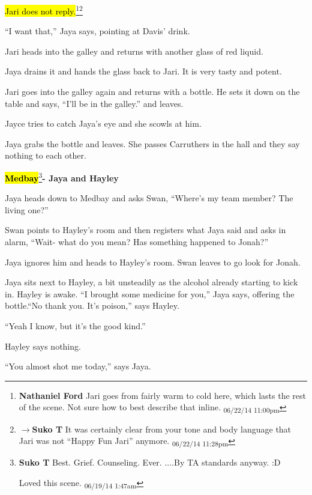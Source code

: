 \hl{Jari does not reply.}\footnote{\textbf{Nathaniel Ford }Jari goes from fairly warm to cold here, which lasts the rest of the scene. Not sure how to best describe that inline. \textsubscript{06/22/14 11:00pm}}\footnote{$\rightarrow$\textbf{Suko T }It was certainly clear from your tone and body language that Jari was not ``Happy Fun Jari'' anymore. \textsubscript{06/22/14 11:28pm}}

``I want that,'' Jaya says, pointing at Davis' drink.

Jari heads into the galley and returns with another glass of red liquid.

Jaya drains it and hands the glass back to Jari.  It is very tasty and potent.

Jari goes into the galley again and returns with a bottle.  He sets it down on the table and says, ``I'll be in the galley.'' and leaves.



Jayce tries to catch Jaya's eye and she scowls at him.



Jaya grabs the bottle and leaves.  She passes Carruthers in the hall and they say nothing to each other.





\textbf{\hl{Medbay}}\footnote{\textbf{Suko T }Best.  Grief.  Counseling.  Ever.  
....By TA standards anyway. :D

Loved this scene. \textsubscript{06/19/14 1:47am}}\textbf{- Jaya and Hayley}



Jaya heads down to Medbay and asks Swan, ``Where's my team member?  The living one?''

Swan points to Hayley's room and then registers what Jaya said and asks in alarm, ``Wait- what do you mean?  Has something happened to Jonah?''



Jaya ignores him and heads to Hayley's room.  Swan leaves to go look for Jonah.



Jaya sits next to Hayley, a bit unsteadily as the alcohol already starting to kick in.  Hayley is awake.  ``I brought some medicine for you,'' Jaya says, offering the bottle.``No thank you.  It's poison,'' says Hayley.

``Yeah I know, but it's the good kind.''

Hayley says nothing.

``You almost shot me today,'' says Jaya.

